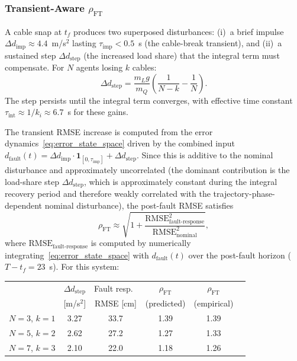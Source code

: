 \subsubsection{Transient-Aware $\rho_{\mathrm{FT}}$}

A cable snap at $t_f$ produces two superposed disturbances: (i)~a brief impulse $\Delta d_{\mathrm{imp}} \approx 4.4$~m/s$^2$ lasting $\tau_{\mathrm{imp}} < 0.5$~s (the cable-break transient), and (ii)~a sustained step $\Delta d_{\mathrm{step}}$ (the increased load share) that the integral term must compensate. For $N$ agents losing $k$ cables:
\begin{equation}\label{eq:delta_step}
  \Delta d_{\mathrm{step}} = \frac{m_L g}{m_Q}\!\left(\frac{1}{N{-}k} - \frac{1}{N}\right).
\end{equation}
The step persists until the integral term converges, with effective time constant $\tau_{\mathrm{int}} \approx 1/k_i \approx 6.7$~s for these gains.

The transient RMSE increase is computed from the error dynamics~\eqref{eq:error_state_space} driven by the combined input $d_{\mathrm{fault}}(t) = \Delta d_{\mathrm{imp}} \cdot \bm{1}_{[0,\tau_{\mathrm{imp}}]} + \Delta d_{\mathrm{step}}$. Since this is additive to the nominal disturbance and approximately uncorrelated (the dominant contribution is the load-share step $\Delta d_{\mathrm{step}}$, which is approximately constant during the integral recovery period and therefore weakly correlated with the trajectory-phase-dependent nominal disturbance), the post-fault RMSE satisfies
\begin{equation}\label{eq:rho_transient}
  \rho_{\mathrm{FT}} \approx \sqrt{1 + \frac{\mathrm{RMSE}_{\mathrm{fault\text{-}response}}^2}{\mathrm{RMSE}_{\mathrm{nominal}}^2}},
\end{equation}
where $\mathrm{RMSE}_{\mathrm{fault\text{-}response}}$ is computed by numerically integrating~\eqref{eq:error_state_space} with $d_{\mathrm{fault}}(t)$ over the post-fault horizon ($T - t_f = 23$~s). For this system:

\begin{center}
\small
\begin{tabular}{@{}lccccc@{}}
\toprule
& $\Delta d_{\mathrm{step}}$ & Fault resp.\ & $\rho_{\mathrm{FT}}$ & $\rho_{\mathrm{FT}}$ & \\
& [m/s$^2$] & RMSE [cm] & (predicted) & (empirical) & \\
\midrule
$N{=}3$, $k{=}1$ & 3.27 & 33.7 & 1.39 & 1.39 \\
$N{=}5$, $k{=}2$ & 2.62 & 27.2 & 1.27 & 1.33 \\
$N{=}7$, $k{=}3$ & 2.10 & 22.0 & 1.18 & 1.26 \\
\bottomrule
\end{tabular}
\end{center}

